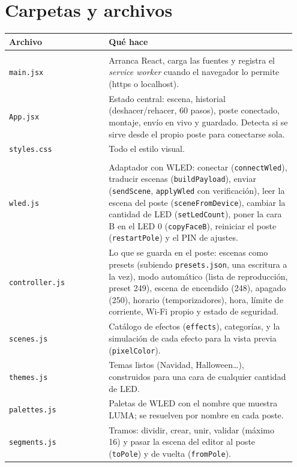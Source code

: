 \section{Carpetas y archivos}

\begin{longtable}{@{}>{\raggedright\arraybackslash}p{0.33\linewidth} >{\raggedright\arraybackslash}p{0.62\linewidth}@{}}
\toprule
\textbf{Archivo} & \textbf{Qué hace} \\ \midrule \endhead
\multicolumn{2}{@{}l}{\textbf{\texttt{src/}}} \\
\texttt{main.jsx} & Arranca React, carga las fuentes y registra el \emph{service worker} cuando el navegador lo permite (https o localhost). \\
\texttt{App.jsx} & Estado central: escena, historial (deshacer/rehacer, 60 pasos), poste conectado, montaje, envío en vivo y guardado. Detecta si se sirve desde el propio poste para conectarse sola. \\
\texttt{styles.css} & Todo el estilo visual. \\
\multicolumn{2}{@{}l}{\textbf{\texttt{src/lib/}} (lógica, sin interfaz, con pruebas)} \\
\texttt{wled.js} & Adaptador con WLED: conectar (\texttt{connectWled}), traducir escenas (\texttt{buildPayload}), enviar (\texttt{sendScene}, \texttt{applyWled} con verificación), leer la escena del poste (\texttt{sceneFromDevice}), cambiar la cantidad de LED (\texttt{setLedCount}), poner la cara B en el LED 0 (\texttt{copyFaceB}), reiniciar el poste (\texttt{restartPole}) y el PIN de ajustes. \\
\texttt{controller.js} & Lo que se guarda en el poste: escenas como presets (subiendo \texttt{presets.json}, una escritura a la vez), modo automático (lista de reproducción, preset 249), escena de encendido (248), apagado (250), horario (temporizadores), hora, límite de corriente, Wi-Fi propio y estado de seguridad. \\
\texttt{scenes.js} & Catálogo de efectos (\texttt{effects}), categorías, y la simulación de cada efecto para la vista previa (\texttt{pixelColor}). \\
\texttt{themes.js} & Temas listos (Navidad, Halloween…), construidos para una cara de cualquier cantidad de LED. \\
\texttt{palettes.js} & Paletas de WLED con el nombre que muestra LUMA; se resuelven por nombre en cada poste. \\
\texttt{segments.js} & Tramos: dividir, crear, unir, validar (máximo 16) y pasar la escena del editor al poste (\texttt{toPole}) y de vuelta (\texttt{fromPole}). \\

\end{longtable}
